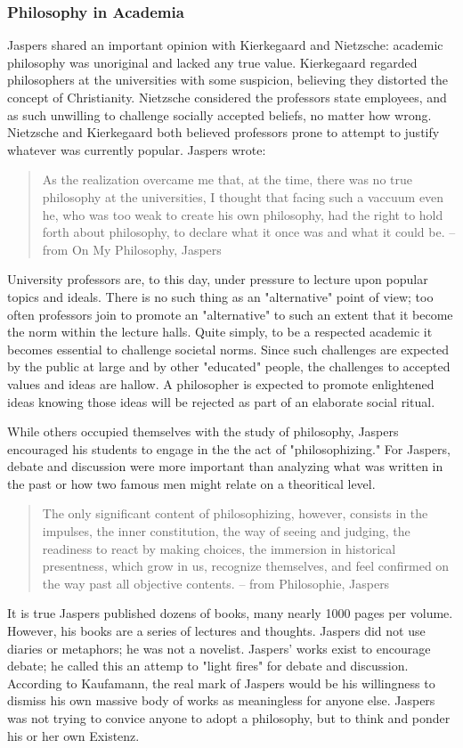 \documentclass[12pt]{article}
\begin{document}
\subsubsection{Philosophy in Academia}
Jaspers shared an important opinion with Kierkegaard and Nietzsche: academic philosophy was unoriginal and lacked any true
value. Kierkegaard regarded philosophers at the universities with some suspicion, believing they distorted the concept of
Christianity. Nietzsche considered the professors state employees, and as such unwilling to challenge socially accepted beliefs,
no matter how wrong. Nietzsche and Kierkegaard both believed professors prone to attempt to justify whatever was currently
popular. Jaspers wrote: 
\begin{quote}
          As the realization overcame me that, at the time, there was no true philosophy at the universities, I thought that
          facing such a vaccuum even he, who was too weak to create his own philosophy, had the right to hold forth about
          philosophy, to declare what it once was and what it could be. -- from On My Philosophy, Jaspers 
\end{quote}
University professors are, to this day, under pressure to lecture upon popular topics and ideals. There is no such thing as an
"alternative" point of view; too often professors join to promote an "alternative" to such an extent that it become the norm within
the lecture halls. Quite simply, to be a respected academic it becomes essential to challenge societal norms. Since such
challenges are expected by the public at large and by other "educated" people, the challenges to accepted values and ideas are
hallow. A philosopher is expected to promote enlightened ideas knowing those ideas will be rejected as part of an elaborate social
ritual. 

While others occupied themselves with the study of philosophy, Jaspers encouraged his students to engage in the the act of
"philosophizing." For Jaspers, debate and discussion were more important than analyzing what was written in the past or how two
famous men might relate on a theoritical level. 
\begin{quote}
          The only significant content of philosophizing, however, consists in the impulses, the inner constitution, the way of
          seeing and judging, the readiness to react by making choices, the immersion in historical presentness, which grow in
          us, recognize themselves, and feel confirmed on the way past all objective contents. -- from Philosophie, Jaspers 
\end{quote}
It is true Jaspers published dozens of books, many nearly 1000 pages per volume. However, his books are a series of lectures and
thoughts. Jaspers did not use diaries or metaphors; he was not a novelist. Jaspers' works exist to encourage debate; he called this
an attemp to "light fires" for debate and discussion. According to Kaufamann, the real mark of Jaspers would be his willingness to
dismiss his own massive body of works as meaningless for anyone else. Jaspers was not trying to convice anyone to adopt a
philosophy, but to think and ponder his or her own Existenz. 
\end{document}
